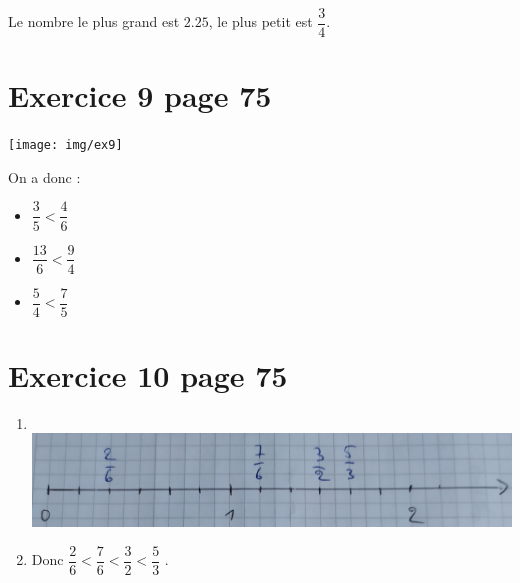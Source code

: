 \documentclass[12pt,a4paper]{article}
\begin{document}
\vspace*{0.25cm}

Le nombre le plus grand est $\num{2.25}$, le plus petit est $\dfrac{3}{4}$.


\section{Exercice 9 page 75}

\texttt{[image: img/ex9]}

On a donc :

\begin{multicols}{3}
	\begin{itemize}
		\item $\dfrac{3}{5} <  \dfrac{4}{6}$
		\item $\dfrac{13}{6} <  \dfrac{9}{4}$
		\item $\dfrac{5}{4} <  \dfrac{7}{5}$
	\end{itemize}
\end{multicols}
\section{Exercice 10 page 75}

\begin{enumerate}
	\item \ \\
	\includegraphics[scale=0.2]{img/ex10}
	
	\item Donc $\dfrac{2}{6} < \dfrac{7}{6} < \dfrac{3}{2} < \dfrac{5}{3}$ .
\end{enumerate}
\end{document}
